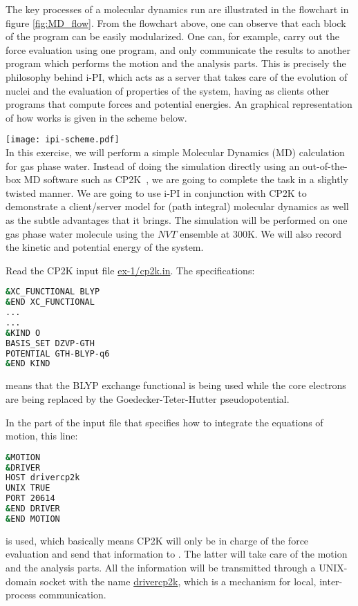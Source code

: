\documentclass{article}
\begin{document}
\begin{Exercise}[label={i-pi},title={Molecular Dynamics: a client/server approach}]
The key processes of a molecular dynamics run are illustrated in the flowchart in figure \ref{fig:MD_flow}. From the flowchart above, one can observe that each block of the program can be easily modularized.
One can, for example, carry out the force evaluation using one program, and only communicate the results to another program which performs the motion and the analysis parts. This is precisely the philosophy behind i-PI, which acts as a server that takes care of the evolution of nuclei and the evaluation of properties of the system, having as clients other programs that compute forces and potential energies. An graphical representation of how \ipi{} works is given in the scheme below.

{\centering\texttt{[image: ipi-scheme.pdf]}} \\



In this exercise, we will perform a simple Molecular Dynamics (MD) calculation for gas phase water. Instead of doing the simulation directly using an out-of-the-box MD software such as CP2K~\cite{citeCP2K}, we are going to complete the task in a slightly twisted manner. We are going to use i-PI in conjunction with CP2K to demonstrate a client/server model for (path integral) molecular dynamics as well as the subtle advantages that it brings. The simulation will be performed on one gas phase water molecule using the $NVT$ ensemble at 300K. We will also record the kinetic and potential energy of the system.

\Question
Read the CP2K input file \url{ex-1/cp2k.in}. The specifications:
\begin{lstlisting}[language=bash]
&XC_FUNCTIONAL BLYP
&END XC_FUNCTIONAL
...
...
&KIND O
BASIS_SET DZVP-GTH
POTENTIAL GTH-BLYP-q6
&END KIND

\end{lstlisting}
means that the BLYP exchange functional is being used while the core electrons are being replaced by the Goedecker-Teter-Hutter pseudopotential. 

In the part of the input file that specifies how to integrate the
equations of motion, this line:
\begin{lstlisting}[language=bash]
&MOTION
&DRIVER
HOST drivercp2k
UNIX TRUE
PORT 20614
&END DRIVER
&END MOTION
\end{lstlisting}
is used, which basically means CP2K will only be in charge of the 
force evaluation and send that information to \ipi{}.
The latter will take care of the motion and the analysis parts.
All the information will be transmitted through a UNIX-domain socket with the name \url{drivercp2k}, which is a mechanism for local, inter-process communication.


\end{Exercise}
\end{document}
